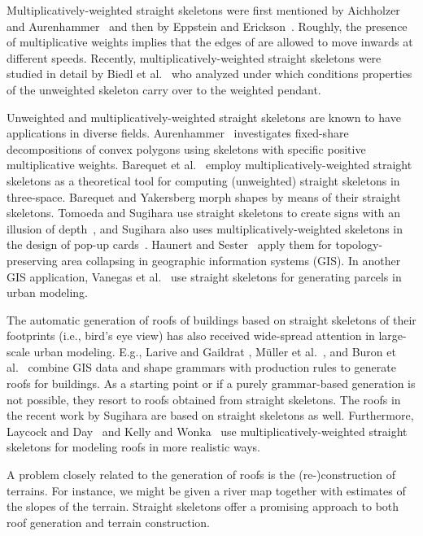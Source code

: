 \documentclass[preprint]{elsarticle}
\begin{document}
Multiplicatively-weighted straight skeletons were first mentioned by
Aichholzer and Aurenhammer~\cite{AiAu98} and then by Eppstein and
Erickson~\cite{EpEr99}.  Roughly, the presence of multiplicative weights
implies that the edges of  are allowed to move inwards at different speeds.
Recently, multiplicatively-weighted straight skeletons were studied in
detail by Biedl et al.~\cite{Bie&15a} who analyzed under which conditions
properties of the unweighted skeleton carry over to the weighted pendant.

Unweighted and multiplicatively-weighted straight skeletons are known to have
applications in diverse fields.
Aurenhammer~\cite{Aurenhammer08} investigates fixed-share decompositions of
convex polygons using skeletons with specific positive multiplicative weights.
Barequet et al.~\cite{Bar&08} employ multiplicatively-weighted straight
skeletons as a theoretical tool for computing (unweighted) straight skeletons
in three-space. Barequet and Yakersberg \cite{BaYa03} morph shapes by means of
their straight skeletons.
Tomoeda and Sugihara use straight skeletons to create signs with an illusion of
depth~\cite{ToSu12}, and
Sugihara also uses multiplicatively-weighted skeletons in the design of pop-up
cards~\cite{Sugihara13}.
Haunert and Sester~\cite{HaSe08} apply them for topology-preserving area
collapsing in geographic information systems (GIS). In another GIS
application, Vanegas et al.\ \cite{Van*12} use straight skeletons for
generating parcels in urban modeling.

The automatic generation of roofs of buildings based on straight skeletons of
their footprints (i.e., bird's eye view) has also received
wide-spread attention in large-scale urban modeling. E.g., Larive and Gaildrat
\cite{LaGa06}, M\"uller et al.\ \cite{Mue*06}, and Buron et al.\ \cite{Bur*13}
combine GIS data and shape grammars with production rules to generate roofs
for buildings. As a starting point or if a purely grammar-based generation is
not possible, they resort to roofs obtained from straight skeletons. The roofs
in the recent work by Sugihara \cite{Sugi13a,Sugi15} are based on straight
skeletons as well.  Furthermore, Laycock and Day~\cite{LaDa03} and Kelly and
Wonka~\cite{KeWo11} use multiplicatively-weighted straight skeletons for
modeling roofs in more realistic ways.

A problem closely related to the generation of roofs is the
(re-)construction of terrains. For instance, we might be given
a river map together with estimates of the slopes of the terrain. Straight
skeletons offer a promising approach to both roof generation and terrain
construction.
\end{document}
